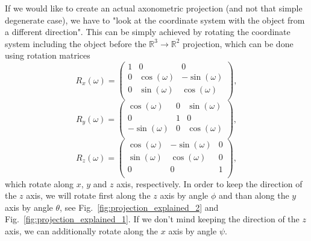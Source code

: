 \documentclass[11pt,a4paper]{article}
\begin{document}
If we would like to create an actual axonometric projection (and not that simple degenerate case), we have to "look at the coordinate system with the object from a different direction". This can be simply achieved by rotating the coordinate system including the object before the $ \mathbb{R}^{3}\rightarrow\mathbb{R}^{2} $ projection, which can be done using rotation matrices
\begin{equation}
R_{x}(\omega)=
\begin{pmatrix}
1 & 0 & 0 \\
0 & \cos(\omega) & -\sin(\omega) \\
0 & \sin(\omega) & \cos(\omega) \\
\end{pmatrix},
\end{equation}
\begin{equation}
R_{y}(\omega)=
\begin{pmatrix}
\cos(\omega) & 0 & \sin(\omega) \\
0 & 1 & 0 \\
-\sin(\omega) & 0 & \cos(\omega) \\
\end{pmatrix},
\end{equation}
\begin{equation}
R_{z}(\omega)=
\begin{pmatrix}
\cos(\omega) & -\sin(\omega) & 0 \\
\sin(\omega) & \cos(\omega) & 0 \\
0 & 0 & 1 \\
\end{pmatrix},
\end{equation}
which rotate along $ x $, $ y $ and $ z $ axis, respectively. In order to keep the direction of the $ z $ axis, we will rotate first along the $ z $ axis by angle $ \phi $ and than along the $ y $ axis by angle $ \theta $, see Fig.~\ref{fig:projection_explained_2} and Fig.~\ref{fig:projection_explained_1}. If we don't mind keeping the direction of the $ z $ axis, we can additionally rotate along the $ x $ axis by angle $ \psi $.




\end{document}
